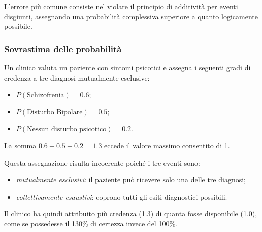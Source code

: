 \documentclass[
  letterpaper,
  DIV=11,
  numbers=noendperiod,
  oneside]{scrreprt}
\providecommand{\tightlist}{%
  \setlength{\itemsep}{0pt}\setlength{\parskip}{0pt}}
\theoremstyle{definition}
\theoremstyle{plain}
\theoremstyle{definition}
\theoremstyle{remark}
\begin{document}
L'errore più comune consiste nel violare il principio di additività per
eventi disgiunti, assegnando una probabilità complessiva superiore a
quanto logicamente possibile.

\begin{tcolorbox}[enhanced jigsaw, arc=.35mm, breakable, colbacktitle=quarto-callout-warning-color!10!white, opacityback=0, toprule=.15mm, rightrule=.15mm, colback=white, opacitybacktitle=0.6, leftrule=.75mm, coltitle=black, bottomtitle=1mm, left=2mm, toptitle=1mm, title=\textcolor{quarto-callout-warning-color}{\faExclamationTriangle}\hspace{0.5em}{Esempio di incoerenza clinica}, titlerule=0mm, bottomrule=.15mm, colframe=quarto-callout-warning-color-frame]

\subsubsection*{Sovrastima delle
probabilità}\label{sovrastima-delle-probabilituxe0}

Un clinico valuta un paziente con sintomi psicotici e assegna i seguenti
gradi di credenza a tre diagnosi mutualmente esclusive:

\begin{itemize}
\tightlist
\item
  \(P(\text{Schizofrenia}) = 0.6\);
\item
  \(P(\text{Disturbo Bipolare}) = 0.5\);\\
\item
  \(P(\text{Nessun disturbo psicotico}) = 0.2\).
\end{itemize}

La somma \(0.6 + 0.5 + 0.2 = 1.3\) eccede il valore massimo consentito
di 1.

Questa assegnazione risulta incoerente poiché i tre eventi sono:

\begin{itemize}
\tightlist
\item
  \emph{mutualmente esclusivi}: il paziente può ricevere solo una delle
  tre diagnosi;
\item
  \emph{collettivamente esaustivi}: coprono tutti gli esiti diagnostici
  possibili.
\end{itemize}

Il clinico ha quindi attribuito più credenza (1.3) di quanta fosse
disponibile (1.0), come se possedesse il 130\% di certezza invece del
100\%.

\end{tcolorbox}
\end{document}
